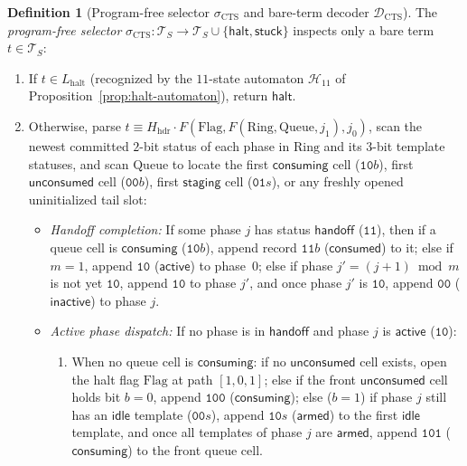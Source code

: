 \documentclass[11pt,reqno]{amsart}
\numberwithin{equation}{section}
\theoremstyle{plain}
\theoremstyle{definition}
\newtheorem{definition}[theorem]{Definition}
\theoremstyle{remark}
\newcommand{\TS}{\mathcal{T}_S}
\begin{document}
\begin{definition}[Program-free selector $\sigma_{\mathrm{CTS}}$ and bare-term decoder $\mathcal{D}_{\mathrm{CTS}}$]\label{def:pf-selector}
The \emph{program-free selector} $\sigma_{\mathrm{CTS}} \colon \TS \to \TS \cup \{\mathsf{halt}, \mathsf{stuck}\}$ inspects only a bare term $t \in \TS$:
\begin{enumerate}[label=(\roman*),leftmargin=2.2em]
  \item If $t \in L_{\mathrm{halt}}$ (recognized by the $11$-state automaton $\mathcal{H}_{11}$ of Proposition~\ref{prop:halt-automaton}), return $\mathsf{halt}$.
  \item Otherwise, parse $t \equiv H_{\mathrm{hdr}} \cdot F(\mathrm{Flag}, F(\mathrm{Ring}, \mathrm{Queue}, j_1), j_0)$, scan the newest committed $2$-bit status of each phase in $\mathrm{Ring}$ and its $3$-bit template statuses, and scan $\mathrm{Queue}$ to locate the first $\mathsf{consuming}$ cell ($\mathtt{10}b$), first $\mathsf{unconsumed}$ cell ($\mathtt{00}b$), first $\mathsf{staging}$ cell ($\mathtt{01}s$), or any freshly opened uninitialized tail slot:
  \begin{itemize}[leftmargin=1.6em]
    \item \emph{Handoff completion:} If some phase $j$ has status $\mathsf{handoff}$ ($\mathtt{11}$), then if a queue cell is $\mathsf{consuming}$ ($\mathtt{10}b$), append record $\mathtt{11}b$ ($\mathsf{consumed}$) to it; else if $m = 1$, append $\mathtt{10}$ ($\mathsf{active}$) to phase~$0$; else if phase $j' = (j+1) \bmod m$ is not yet $\mathtt{10}$, append $\mathtt{10}$ to phase $j'$, and once phase $j'$ is $\mathtt{10}$, append $\mathtt{00}$ ($\mathsf{inactive}$) to phase $j$.
    \item \emph{Active phase dispatch:} If no phase is in $\mathsf{handoff}$ and phase $j$ is $\mathsf{active}$ ($\mathtt{10}$):
      \begin{enumerate}[label=(\alph*),leftmargin=1.8em]
        \item When no queue cell is $\mathsf{consuming}$: if no $\mathsf{unconsumed}$ cell exists, open the halt flag $\mathrm{Flag}$ at path $[1,0,1]$; else if the front $\mathsf{unconsumed}$ cell holds bit $b = 0$, append $\mathtt{100}$ ($\mathsf{consuming}$); else ($b = 1$) if phase $j$ still has an $\mathsf{idle}$ template ($\mathtt{00}s$), append $\mathtt{10}s$ ($\mathsf{armed}$) to the first $\mathsf{idle}$ template, and once all templates of phase $j$ are $\mathsf{armed}$, append $\mathtt{101}$ ($\mathsf{consuming}$) to the front queue cell.

\end{enumerate}
\end{itemize}
\end{enumerate}
\end{definition}
\end{document}
